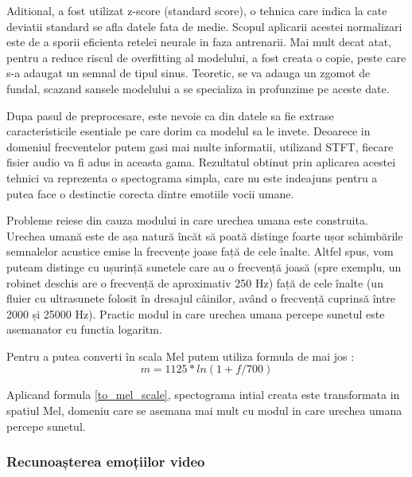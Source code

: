 \documentclass[a4paper, 12pt]{report}
\begin{document}
	Aditional, a fost utilizat z-score (standard score), o tehnica care indica la cate deviatii standard se afla datele fata de medie. Scopul aplicarii acestei normalizari este de a sporii eficienta retelei neurale in faza antrenarii. Mai mult decat atat, pentru a reduce riscul de overfitting al modelului, a fost creata o copie, peste care s-a adaugat un semnal de tipul sinus. Teoretic, se va adauga un zgomot de fundal, scazand sansele modelului a se specializa in profunzime pe aceste date.
	
	Dupa pasul de preprocesare, este nevoie ca din datele sa fie extrase caracteristicile esentiale pe care dorim ca modelul sa le invete. Deoarece in domeniul frecventelor putem gasi mai multe informatii, utilizand STFT, fiecare fisier audio va fi adus in aceasta gama. Rezultatul obtinut prin aplicarea acestei tehnici va reprezenta o spectograma simpla, care nu este indeajuns pentru a putea face o destinctie corecta dintre emotiile vocii umane. 
	
	Probleme reiese din cauza modului in care urechea umana este construita. Urechea umană este de așa natură încăt să poată distinge foarte ușor schimbările semnalelor acustice emise la frecvențe joase față de cele înalte. Altfel spus, vom puteam distinge cu ușurință sunetele care au o frecvență joasă (spre exemplu, un robinet deschis are o frecvență de aproximativ 250 Hz) față de cele înalte (un fluier cu ultrasunete folosit în dresajul câinilor, având o frecvență cuprinsă între 2000 și 25000 Hz). Practic modul in care urechea umana percepe sunetul este asemanator cu functia logaritm.
	
	Pentru a putea converti în scala Mel putem utiliza formula de mai jos :
	\begin{equation}
	\label{to_mel_scale}
		m=1125 * ln(1+f/700)
	\end{equation}
	
	Aplicand formula \ref{to_mel_scale}, spectograma intial creata este transformata in spatiul Mel, domeniu care se asemana mai mult cu modul in care urechea umana percepe sunetul.
	
	
	
	
	\clearpage
	\subsubsection{Recunoașterea emoțiilor video}
	
\end{document}
